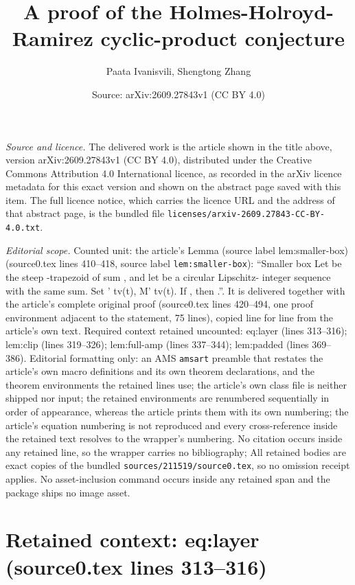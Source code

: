 \documentclass[10pt,a4paper]{amsart}
\title[A proof of the Holmes-Holroyd-Ramirez cyclic-product conjecture]{A proof of the Holmes-Holroyd-Ramirez cyclic-product conjecture}
\author{Paata Ivanisvili, Shengtong Zhang}
\date{Source: arXiv:2609.27843v1 (CC BY 4.0)}
\theoremstyle{plain}
\theoremstyle{definition}
\begin{document}
\maketitle

\noindent\emph{Source and licence.} The delivered work is the article shown in the title above, version arXiv:2609.27843v1 (CC BY 4.0), distributed under the Creative Commons Attribution 4.0 International licence, as recorded in the arXiv licence metadata for this exact version and shown on the abstract page saved with this item. The full licence notice, which carries the licence URL and the address of that abstract page, is the bundled file \texttt{licenses/arxiv-2609.27843-CC-BY-4.0.txt}.
\par\smallskip

\noindent\textit{Editorial scope.} Counted unit: the article's Lemma (source label lem:smaller-box) (source0.tex lines 410--418, source label \texttt{lem:smaller-box}): ``Smaller box Let be the steep -trapezoid of sum , and let be a circular Lipschitz- integer sequence with the same sum. Set ' tv(t), M' tv(t). If , then .''. It is delivered together with the article's complete original proof (source0.tex lines 420--494, one proof environment adjacent to the statement, 75 lines), copied line for line from the article's own text. Required context retained uncounted: eq:layer (lines 313--316); lem:clip (lines 319--326); lem:full-amp (lines 337--344); lem:padded (lines 369--386). Editorial formatting only: an AMS \texttt{amsart} preamble that restates the article's own macro definitions and its own theorem declarations, and the theorem environments the retained lines use; the article's own class file is neither shipped nor input; the retained environments are renumbered sequentially in order of appearance, whereas the article prints them with its own numbering; the article's equation numbering is not reproduced and every cross-reference inside the retained text resolves to the wrapper's numbering. No citation occurs inside any retained line, so the wrapper carries no bibliography; All retained bodies are exact copies of the bundled \texttt{sources/211519/source0.tex}, so no omission receipt applies. No asset-inclusion command occurs inside any retained span and the package ships no image asset.


\section*{Retained context: eq:layer (source0.tex lines 313--316)}
\end{document}
